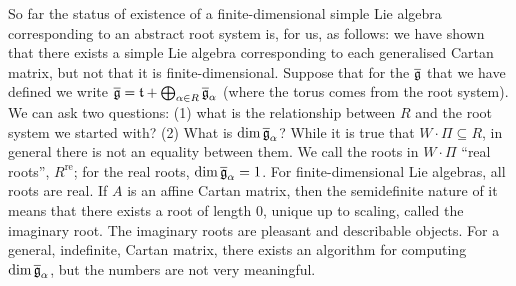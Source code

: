 \begin{remark}
So far the status of existence of a finite-dimensional simple Lie algebra
corresponding to an abstract root system is, for us, as follows: we have shown
that there exists a simple Lie algebra corresponding to each generalised
Cartan matrix, but not that it is finite-dimensional. Suppose that for the
$\overline{\mathfrak{g}}$ that we have defined we write
$\overline{\mathfrak{g}} = \mathfrak{t} + \bigoplus_{\alpha \in R} \overline{\mathfrak{g}}_\alpha$ (where the torus comes
from the root system). We can ask two questions: (1) what is the relationship
between $R$ and the root system we started with? (2) What is
$\dim \overline{\mathfrak{g}}_\alpha$? While it is true that $W \cdot \Pi \subseteq R$, in
general there is not an equality between them. We call the roots in
$W \cdot \Pi$ ``real roots'', $R^{\mathrm{re}}$; for the real roots,
$\dim \overline{\mathfrak{g}}_\alpha = 1$. For finite-dimensional Lie algebras, all roots are
real. If $A$ is an affine Cartan matrix, then the semidefinite nature of it
means that there exists a root of length $0$, unique up to scaling, called the
imaginary root. The imaginary roots are pleasant and describable objects. For
a general, indefinite, Cartan matrix, there exists an algorithm for computing
$\dim \overline{\mathfrak{g}}_\alpha$, but the numbers are not very meaningful.
\end{remark}
